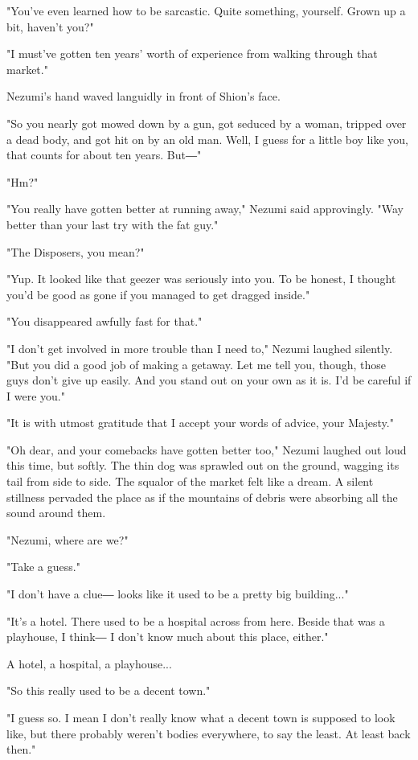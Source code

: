 "You've even learned how to be sarcastic. Quite something, yourself.
Grown up a bit, haven't you?"

"I must've gotten ten years' worth of experience from walking through
that market."

Nezumi's hand waved languidly in front of Shion's face.

"So you nearly got mowed down by a gun, got seduced by a woman, tripped
over a dead body, and got hit on by an old man. Well, I guess for a
little boy like you, that counts for about ten years. But―"

"Hm?"

"You really have gotten better at running away," Nezumi said
approvingly. "Way better than your last try with the fat guy."

"The Disposers, you mean?"

"Yup. It looked like that geezer was seriously into you. To be honest, I
thought you'd be good as gone if you managed to get dragged inside."

"You disappeared awfully fast for that."

"I don't get involved in more trouble than I need to," Nezumi laughed
silently. "But you did a good job of making a getaway. Let me tell you,
though, those guys don't give up easily. And you stand out on your own
as it is. I'd be careful if I were you."

"It is with utmost gratitude that I accept your words of advice, your
Majesty."

"Oh dear, and your comebacks have gotten better too," Nezumi laughed out
loud this time, but softly. The thin dog was sprawled out on the ground,
wagging its tail from side to side. The squalor of the market felt like
a dream. A silent stillness pervaded the place as if the mountains of
debris were absorbing all the sound around them.

"Nezumi, where are we?"

"Take a guess."

"I don't have a clue― looks like it used to be a pretty big building..."

"It's a hotel. There used to be a hospital across from here. Beside that
was a playhouse, I think― I don't know much about this place, either."

A hotel, a hospital, a playhouse...

"So this really used to be a decent town."

"I guess so. I mean I don't really know what a decent town is supposed
to look like, but there probably weren't bodies everywhere, to say the
least. At least back then."

